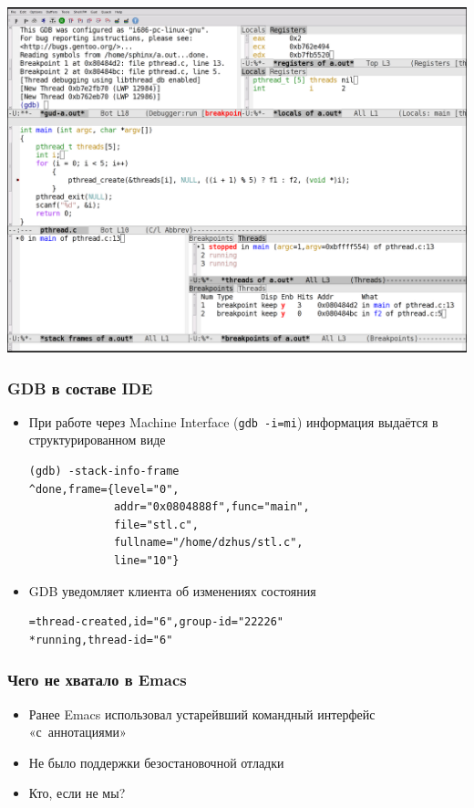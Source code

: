 \documentclass[onlymath]{beamer}
\newcommand\code\texttt
\begin{document}
\begin{frame}[plain]
  \includegraphics[height=\paperheight]{emacs-gdb.png}
\end{frame}


\begin{frame}[fragile]
  \frametitle{GDB в составе IDE}
  \begin{itemize}
  \item При работе через Machine Interface (\code{gdb -i=mi})
    информация выдаётся в структурированном виде
\begin{lstlisting}[style=session]
(gdb) -stack-info-frame
^done,frame={level="0",
             addr="0x0804888f",func="main",
             file="stl.c",
             fullname="/home/dzhus/stl.c",
             line="10"}
\end{lstlisting}
  \item GDB уведомляет клиента об изменениях состояния
\begin{lstlisting}[style=session]
=thread-created,id="6",group-id="22226"
*running,thread-id="6"
\end{lstlisting}
  \end{itemize}
\end{frame}

\begin{frame}
  \frametitle{Чего не хватало в Emacs}
  \begin{itemize}
  \item Ранее Emacs использовал устарейвший командный интерфейс
    «с аннотациями»
  \item Не было поддержки безостановочной отладки
  \item Кто, если не мы?
  \end{itemize}
\end{frame}
\end{document}
